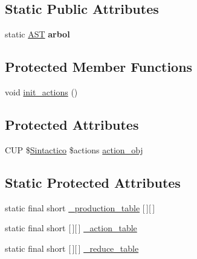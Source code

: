 \subsection*{Static Public Attributes}
\begin{DoxyCompactItemize}
\item 
\mbox{\label{classanalizadores_1_1_sintactico_ab89b63ffa29f7540b052d3b280410b1a}} 
static \mbox{\hyperlink{classast_1_1_a_s_t}{A\+ST}} {\bfseries arbol}
\end{DoxyCompactItemize}
\subsection*{Protected Member Functions}
\begin{DoxyCompactItemize}
\item 
void \mbox{\hyperlink{classanalizadores_1_1_sintactico_a597096a94b0afea4458c5ed107e94fa4}{init\+\_\+actions}} ()
\end{DoxyCompactItemize}
\subsection*{Protected Attributes}
\begin{DoxyCompactItemize}
\item 
C\+UP \$\mbox{\hyperlink{classanalizadores_1_1_sintactico}{Sintactico}} \$actions \mbox{\hyperlink{classanalizadores_1_1_sintactico_a7e14d36a24d6ed982b06e2b9ac181c4f}{action\+\_\+obj}}
\end{DoxyCompactItemize}
\subsection*{Static Protected Attributes}
\begin{DoxyCompactItemize}
\item 
static final short \mbox{\hyperlink{classanalizadores_1_1_sintactico_a52126500456048c148f0500de4ae22c2}{\+\_\+production\+\_\+table}} \mbox{[}$\,$\mbox{]}\mbox{[}$\,$\mbox{]}
\item 
static final short \mbox{[}$\,$\mbox{]}\mbox{[}$\,$\mbox{]} \mbox{\hyperlink{classanalizadores_1_1_sintactico_aa0bda09b109ddbd0c36c756531879b0f}{\+\_\+action\+\_\+table}}
\item 
static final short \mbox{[}$\,$\mbox{]}\mbox{[}$\,$\mbox{]} \mbox{\hyperlink{classanalizadores_1_1_sintactico_a96c2098df27363aea8d9d18a9c4fa469}{\+\_\+reduce\+\_\+table}}
\end{DoxyCompactItemize}


